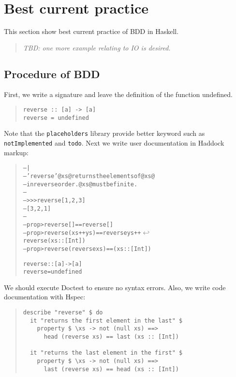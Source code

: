 \documentclass[preprint]{sigplanconf}
\begin{document}
\section{Best current practice}
\label{ref:Best-current-practice}

This section show best current practice of
BDD in Haskell.

\begin{quote}
    \emph{TBD: one more example relating to IO is desired.}
\end{quote}

\subsection{Procedure of BDD}

First, we write a signature and leave the definition of the function undefined.

\begin{quote}
\small
\begin{verbatim}
reverse :: [a] -> [a]
reverse = undefined
\end{verbatim}
\end{quote}

\noindent Note that the {\tt placeholders} library provide better keyword such as {\tt notImplemented} and {\tt todo}.
Next we write user documentation in Haddock markup:

\begin{quote}
\small
\begin{alltt}
-- |
-- 'reverse' @xs@ returns the elements of @xs@
-- in reverse order. @xs@ must be finite.
--
-- >>> reverse [1,2,3]
-- [3,2,1]
--
-- prop> reverse [] == reverse []
-- prop> reverse (xs ++ ys) == reverse ys ++ \(\hookleftarrow\)
                               reverse (xs::[Int])
-- prop> reverse (reverse xs) == (xs::[Int])

reverse :: [a] -> [a]
reverse = undefined
\end{alltt}
\end{quote}

\noindent We should execute Doctest to ensure no syntax errors.
Also, we write code documentation with Hspec:

\begin{quote}
\small
\begin{verbatim}
describe "reverse" $ do
  it "returns the first element in the last" $
    property $ \xs -> not (null xs) ==>
      head (reverse xs) == last (xs :: [Int])

  it "returns the last element in the first" $
    property $ \xs -> not (null xs) ==>
      last (reverse xs) == head (xs :: [Int])
\end{verbatim}
\end{quote}
\end{document}
